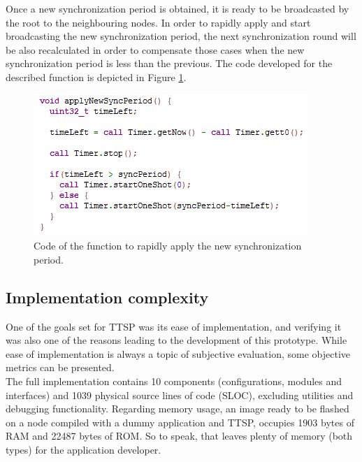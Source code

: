 Once a new synchronization period is obtained, it is ready to be broadcasted by the root to the neighbouring nodes. In order to rapidly apply and start broadcasting the new synchronization period, the next synchronization round will be also recalculated in order to compensate those cases when the new synchronization period is less than the previous. The code developed for the described function is depicted in Figure \ref{adaptivecode2}.

\begin{figure}[!htb]
\begin{center}
\includegraphics[scale=0.5]{./images/34-ttsp-adaptive_code2.png}
\end{center}
\caption{Code of the function to rapidly apply the new synchronization period.}
\label{adaptivecode2}
\end{figure}

\subsection{Implementation complexity}
One of the goals set for TTSP was its ease of implementation, and verifying it was also one of the reasons leading to the development of this prototype. While ease of implementation is always a topic of subjective evaluation, some objective metrics can be presented.\\
The full implementation contains 10 components (configurations, modules and interfaces) and 1039 physical source lines of code (SLOC), excluding utilities and debugging functionality.
Regarding memory usage, an image ready to be flashed on a node compiled with a dummy application and TTSP, occupies 1903 bytes of RAM and 22487 bytes of ROM. So to speak, that leaves plenty of memory (both types) for the application developer.

